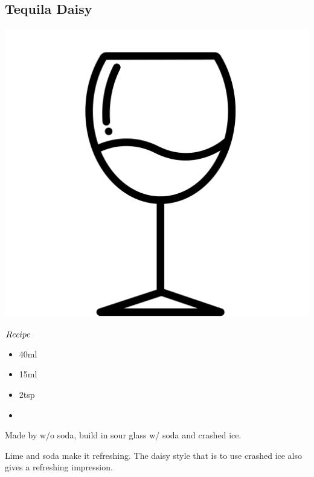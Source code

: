\subsection{Tequila Daisy}
\vspace{-7.2mm}
\hspace{40mm}
\includegraphics[scale=.03]{cocktail_glass_sour.png}
\vspace{2.5mm}
\begin{itembox}[l]{\boldmath $Recipe$}
\begin{itemize}
\setlength{\parskip}{0cm}
\setlength{\itemsep}{0cm}
\item \teq 40ml
\item \limj 15ml
\item \gs 2tsp
\item \soda
\end{itemize}
\vspace{-4mm}
Made by \shake w/o soda, build in sour glass w/ soda and crashed ice.
\end{itembox}
Lime and soda make it refreshing. The daisy style that is to use crashed ice
also gives a refreshing impression.
